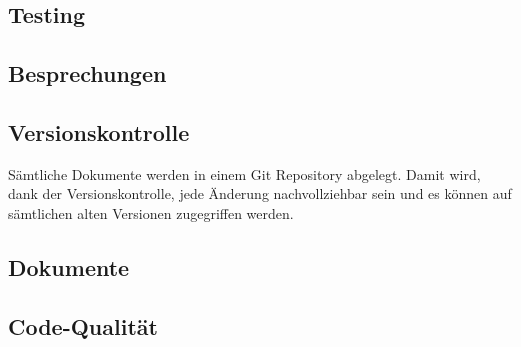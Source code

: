 \documentclass[
	ngerman,
	toc=listof, %
	toc=bibliography, %
	footnotes=multiple, %
	parskip=half, %
	numbers=noendperiod %
]{scrartcl}
\begin{document}
	\subsection{Testing}

	\subsection{Besprechungen}

	\subsection{Versionskontrolle}
		Sämtliche Dokumente werden in einem Git Repository abgelegt. Damit wird, dank der Versionskontrolle, 
		jede Änderung nachvollziehbar sein und es können auf sämtlichen alten Versionen zugegriffen werden.

	\subsection{Dokumente}

	\subsection{Code-Qualität}
\end{document}
